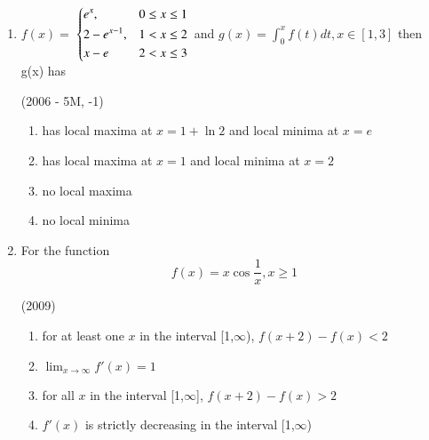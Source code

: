 \documentclass[journal,12pt,twocolumn]{IEEEtran}
\theoremstyle{remark}
\begin{document}
\begin{enumerate}[start = 7]
{            $f(x)$ is a cubic polynomial with  $f(2)=18$ and $f(1)=-1$. Also $f(x)$ has a local maxima at $x=-1$ and $f'(x)$ has a local minima at $x=0$, then
            \begin{flushright}
                {(2006 - 5M, -1)}
            \end{flushright}
            \begin{enumerate}
                \item the distance between (-1,2) and ($a,f(a)$), where $x=a$ is the point of local minima is $2\sqrt{5}$
                \item $f(x)$ is increasing for $x$ $\in [1,2\sqrt{5}$]
                \item $f(x)$ has a local minima at $x$=1
                \item the value of $f(0)=15$
            \end{enumerate}
        
        }
    \item{
        
            $f(x) = $    
            $\begin{dcases}%
                e^x, & 0 \leq x\leq 1 \\
                2-e^{x-1}, & 1 < x\leq 2 \\
                x-e & 2 < x\leq 3 \\
            \end{dcases}$ and $g(x) = \int_0^{x}f(t)dt, x \in[1,3]$ then g(x) has
            \begin{flushright}
                {(2006 - 5M, -1)}
            \end{flushright}
            \begin{enumerate}
                \item has local maxima at $x = 1+ \ln{2}$ and local minima at $x = e$
                \item has local maxima at $x = 1$ and local minima at $x = 2$
                \item no local maxima
                \item no local minima
            \end{enumerate}
        
        }
    \item{
        
            For the function $$f(x) = x\cos{\frac{1}{x}}, x\geq1$$
            \begin{flushright}
                {(2009)}
            \end{flushright}
            \begin{enumerate}
                \item for at least one $x$ in the interval [1,$\infty$), $f(x+2)-f(x)<2$
                \item $\lim_{x\to\infty} f'(x) = 1$
                \item for all $x$ in the interval [1,$\infty$], $f(x+2)-f(x)>2$
                \item $f'(x)$ is strictly decreasing in the interval [1,$\infty$)
            \end{enumerate}
        
}
\end{enumerate}
\end{document}
